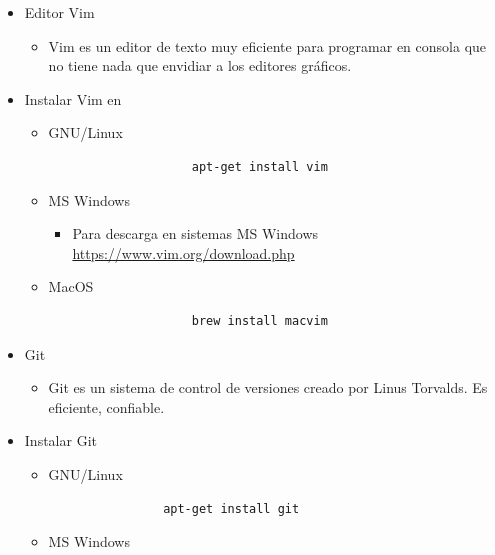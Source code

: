 \documentclass{article}
\begin{document}
	\begin{itemize}
		\item Editor Vim
        \begin{itemize}
            \item Vim es un editor de texto muy eficiente para programar en consola que no tiene nada que envidiar a los editores gráficos.
        \end{itemize}
        \item Instalar Vim en
        \begin{itemize}
            \item GNU/Linux
            \begin{itemize}
                \begin{lstlisting}
                    apt-get install vim
                \end{lstlisting}
            \end{itemize}
            \item MS Windows
            \begin{itemize}
                \item Para descarga en sistemas MS Windows \url{https://www.vim.org/download.php}
            \end{itemize}
            \item MacOS
            \begin{itemize}
                \begin{lstlisting}
                    brew install macvim
                \end{lstlisting}
            \end{itemize}
        \end{itemize}
        \item Git
        \begin{itemize}
            \item Git es un sistema de control de versiones creado por Linus Torvalds. Es eficiente, confiable.
        \end{itemize}
        \item Instalar Git
        \begin{itemize}
            \item GNU/Linux
            \begin{itemize}
                \begin{lstlisting}
                apt-get install git    
                \end{lstlisting}
            \end{itemize}
            \item MS Windows

\end{itemize}
\end{itemize}
\end{document}
